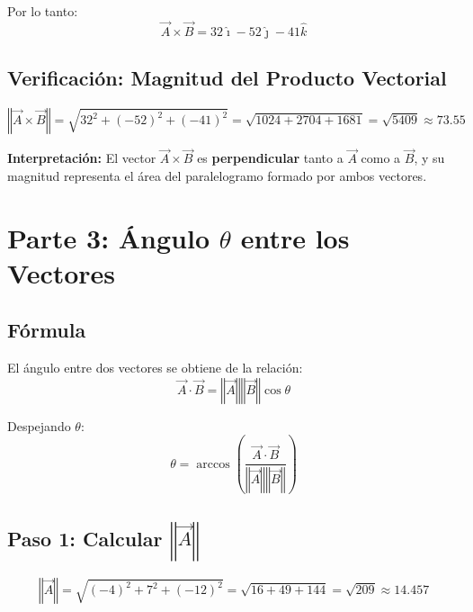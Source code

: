 \documentclass[12pt,letterpaper]{article}
\begin{document}
Por lo tanto:
\begin{equation*}
\boxed{\vec{A} \times \vec{B} = 32\hat{\imath} - 52\hat{\jmath} - 41\hat{k}}
\end{equation*}

\subsection*{Verificaci\'on: Magnitud del Producto Vectorial}

\begin{equation*}
\left\Vert \vec{A} \times \vec{B} \right\Vert = \sqrt{32^2 + (-52)^2 + (-41)^2} = \sqrt{1024 + 2704 + 1681} = \sqrt{5409} \approx 73.55
\end{equation*}

\textbf{Interpretaci\'on:} El vector $\vec{A} \times \vec{B}$ es \textbf{perpendicular} tanto a $\vec{A}$ como a $\vec{B}$, y su magnitud representa el \'area del paralelogramo formado por ambos vectores.

\section*{Parte 3: \'Angulo $\theta$ entre los Vectores}

\subsection*{F\'ormula}

El \'angulo entre dos vectores se obtiene de la relaci\'on:
\begin{equation*}
\vec{A} \cdot \vec{B} = \left\Vert \vec{A} \right\Vert \left\Vert \vec{B} \right\Vert \cos\theta
\end{equation*}

Despejando $\theta$:
\begin{equation*}
\theta = \arccos\left( \frac{\vec{A} \cdot \vec{B}}{\left\Vert \vec{A} \right\Vert \left\Vert \vec{B} \right\Vert} \right)
\end{equation*}

\subsection*{Paso 1: Calcular $\left\Vert \vec{A} \right\Vert$}

\begin{equation*}
\left\Vert \vec{A} \right\Vert = \sqrt{(-4)^2 + 7^2 + (-12)^2} = \sqrt{16 + 49 + 144} = \sqrt{209} \approx \boxed{14.457}
\end{equation*}
\end{document}
